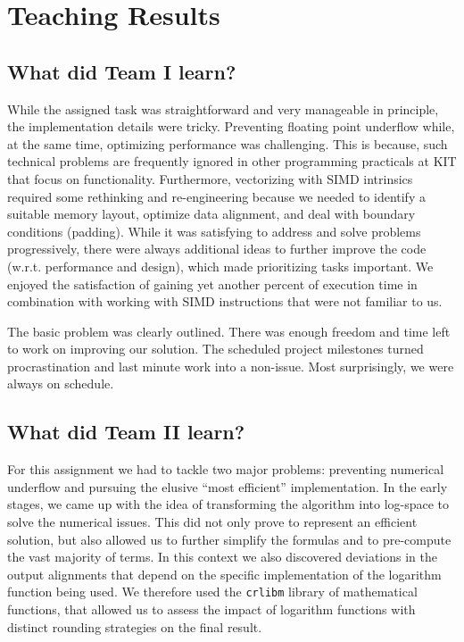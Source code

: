 \documentclass[runningheads,a4paper]{llncs}
\begin{document}
\section{Teaching Results}
\label{teaching-results}
\subsection{What did Team I learn?}
While the assigned task was straightforward and very manageable in principle,
the implementation details were tricky.
Preventing floating point underflow while, at the same time, optimizing performance was challenging.
This is because, such technical problems are frequently ignored in other programming practicals at KIT
that focus on functionality.
Furthermore, vectorizing with SIMD intrinsics required some rethinking and re-engineering
because we needed to identify a suitable memory layout, optimize data alignment,
and deal with boundary conditions (padding).
While it was satisfying to address and solve problems progressively,
there were always additional ideas to further improve the code (w.r.t. performance and design),
which made prioritizing tasks important.
We enjoyed the satisfaction of gaining yet another percent of execution time in combination
with working with SIMD instructions that were not familiar to us.

The basic problem was clearly outlined. There was enough freedom and time left
to work on improving our solution. The scheduled project milestones
turned procrastination and last minute work into a non-issue.
Most surprisingly, we were always on schedule.



\subsection{What did Team II learn?}
For this assignment we had to tackle two major problems: preventing numerical underflow  and
pursuing the elusive ``most efficient'' implementation.
In the early stages, we came up with the idea of transforming the algorithm into log-space to solve the numerical issues.
This did not only prove to represent an efficient solution, but also allowed us to further simplify the formulas and to pre-compute the vast majority of terms.
In this context we also discovered deviations in the output alignments
that depend on the specific implementation of the logarithm function being used.
We therefore used the \texttt{crlibm} library of mathematical functions, that allowed us to assess the impact of logarithm functions with distinct rounding strategies
on the final result.
\end{document}

